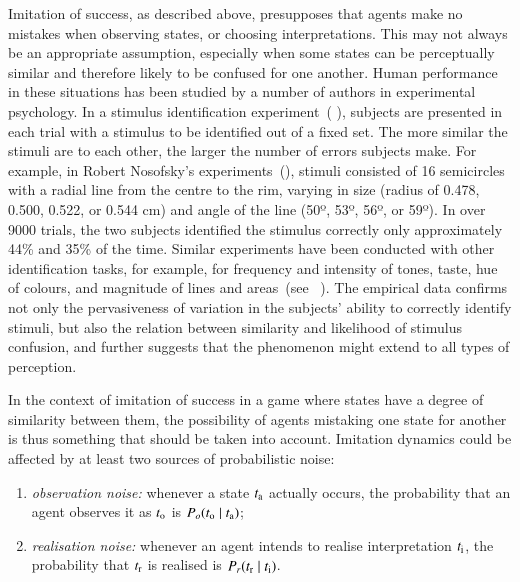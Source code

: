 \documentclass[11pt,english]{article}
\numberwithin{equation}{section}
\newcommand{\citepbjps}[1]{(\citeauthor{#1} \citeyear{#1})}
\newcommand{\citepbjpspre}[2]{(#1~\citeauthor{#2} \citeyear{#2})}
\newcommand{\citeyearparbjps}[1]{(\citeyear{#1})}
\begin{document}
Imitation of success, as described above, presupposes that agents make no mistakes when
observing states, or choosing interpretations. This may not always be an appropriate
assumption, especially when some states can be perceptually similar and therefore likely to be
confused for one another.
Human performance in these situations has been studied by a number of authors in experimental psychology. %
In a stimulus identification experiment~\citepbjps{luce-detection-1963}, subjects are presented in each trial with a stimulus to be identified out of a fixed set.
The more similar the stimuli are to each other, the larger the number of errors subjects make.
For example, in Robert Nosofsky's experiments~\citeyearparbjps{Nosofsky1986:Attention-Simil}, stimuli consisted of 16 semicircles with a radial line from the centre to the rim, varying in size (radius of 0.478, 0.500, 0.522, or 0.544 cm) and angle of the line (50º, 53º, 56º, or 59º).
In over 9000 trials, the two subjects identified the stimulus correctly only approximately 44\% and 35\% of the time.
Similar experiments have been conducted with other identification tasks, for example, for frequency and intensity of tones, taste, hue of colours, and magnitude of lines and areas~\citepbjpspre{see}{donkin-why-2015}.
The empirical data confirms not only the pervasiveness of variation in the subjects' ability to correctly identify stimuli, but also the relation between similarity and likelihood of stimulus confusion, and further suggests that the phenomenon might extend to all types of perception.

In the context of imitation of success in a game where states have a degree of similarity between them, the possibility of agents mistaking one state for another is thus something that should be taken into account.
Imitation dynamics could be affected by at least two sources of probabilistic noise:

\begin{enumerate}
\item \emph{observation noise:} whenever a state $t_{\mathrm{a}}$ actually occurs, the probability
  that an agent observes it as $t_{\mathrm{o}}$ is $P_o(t_{\mathrm{o}} \mid t_{\mathrm{a}})$;
\item \emph{realisation noise:} whenever an agent intends to realise interpretation
  $t_{\mathrm{i}}$, the probability that $t_{\mathrm{r}}$ is realised is
  $P_r(t_{\mathrm{r}} \mid t_{\mathrm{i}})$.
\end{enumerate}
\end{document}
